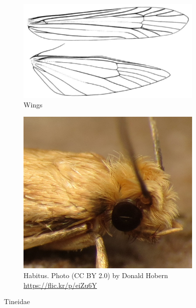 \documentclass[letterpaper, 11pt]{article}
\begin{document}
\begin{figure}[ht!]
    \centering
    \begin{subfigure}[ht!]{0.45\textwidth}
        \includegraphics[width=\textwidth]{TineidWings}
        \caption{Wings \citep[][Fig. 6]{DavisTineid1998}}
        \label{fig:tineid1}
    \end{subfigure}
    \hfill %
    \begin{subfigure}[ht!]{0.38\textwidth}
        \includegraphics[width=\textwidth]{TineidHead}
        \caption{Habitus. Photo (CC BY 2.0) by Donald Hobern \url{https://flic.kr/p/eiZu6Y}}
        \label{fig:tineid2}
    \end{subfigure}
    \caption{Tineidae}\label{fig:tineids}
\end{figure}
\end{document}
